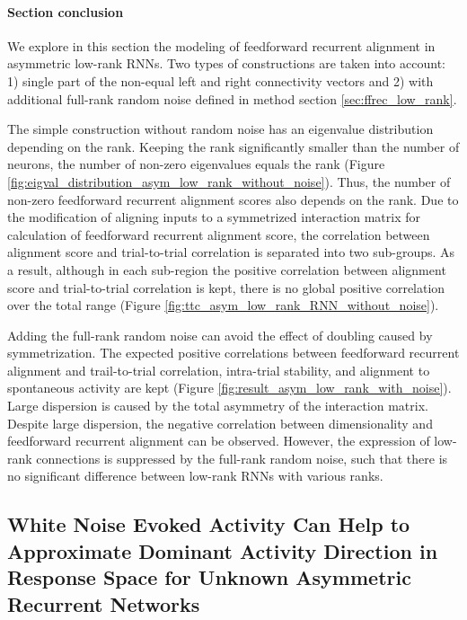 \documentclass[11pt]{article}
\begin{document}
	\vspace{0.7cm}
	\paragraph{Section conclusion}
	We explore in this section the modeling of feedforward recurrent alignment in asymmetric low-rank RNNs. Two types of constructions are taken into account: 1) single part of the non-equal left and right connectivity vectors and 2) with additional full-rank random noise defined in method section \ref{sec:ffrec_low_rank}. 
	
	The simple construction without random noise has an eigenvalue distribution depending on the rank. Keeping the rank significantly smaller than the number of neurons, the number of non-zero eigenvalues equals the rank (Figure \ref{fig:eigval_distribution_asym_low_rank_without_noise}). Thus, the number of non-zero feedforward recurrent alignment scores also depends on the rank. Due to the modification of aligning inputs to a symmetrized interaction matrix for calculation of feedforward recurrent alignment score, the correlation between alignment score and trial-to-trial correlation is separated into two sub-groups. As a result, although in each sub-region the positive correlation between alignment score and trial-to-trial correlation is kept, there is no global positive correlation over the total range (Figure \ref{fig:ttc_asym_low_rank_RNN_without_noise}). 
	
	Adding the full-rank random noise can avoid the effect of doubling caused by symmetrization. The expected positive correlations between feedforward recurrent alignment and trail-to-trial correlation, intra-trial stability, and alignment to spontaneous activity are kept (Figure \ref{fig:result_asym_low_rank_with_noise}). Large dispersion is caused by the total asymmetry of the interaction matrix. Despite large dispersion, the negative correlation between dimensionality and feedforward recurrent alignment can be observed. However, the expression of low-rank connections is suppressed by the full-rank random noise, such that there is no significant difference between low-rank RNNs with various ranks. 
	
	\clearpage
	\subsection{White Noise Evoked Activity Can Help to Approximate Dominant Activity Direction in Response Space for Unknown Asymmetric Recurrent Networks} \label{sec:black_box_result}
\end{document}
